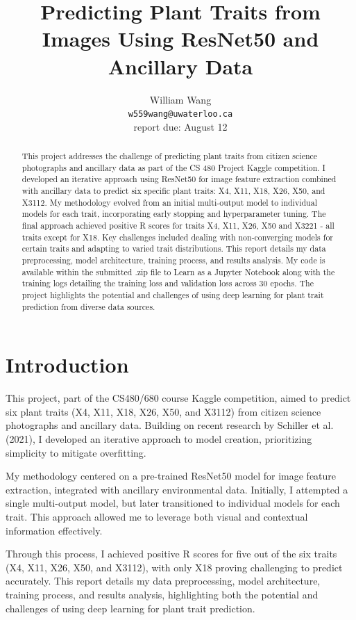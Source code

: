 \documentclass{article}
\title{Predicting Plant Traits from Images Using ResNet50 and Ancillary Data}
\author{
	William Wang \\
	\texttt{w559wang@uwaterloo.ca} \\
	{\color{red} report due: August 12}
}
\begin{document}
\maketitle

\begin{abstract} 
This project addresses the challenge of predicting plant traits from citizen science photographs and ancillary data as part of the CS 480 Project Kaggle competition. I developed an iterative approach using ResNet50 for image feature extraction combined with ancillary data to predict six specific plant traits: X4, X11, X18, X26, X50, and X3112. My methodology evolved from an initial multi-output model to individual models for each trait, incorporating early stopping and hyperparameter tuning. The final approach achieved positive R scores for traits X4, X11, X26, X50 and X3221 - all traits except for X18. Key challenges included dealing with non-converging models for certain traits and adapting to varied trait distributions. This report details my data preprocessing, model architecture, training process, and results analysis. My code is available within the submitted .zip file to Learn as a Jupyter Notebook along with the training logs detailing the training loss and validation loss across 30 epochs. The project highlights the potential and challenges of using deep learning for plant trait prediction from diverse data sources.
\end{abstract} 

\section{Introduction}
This project, part of the CS480/680 course Kaggle competition, aimed to predict six plant traits (X4, X11, X18, X26, X50, and X3112) from citizen science photographs and ancillary data. Building on recent research by Schiller et al. (2021), I developed an iterative approach to model creation, prioritizing simplicity to mitigate overfitting.

My methodology centered on a pre-trained ResNet50 model for image feature extraction, integrated with ancillary environmental data. Initially, I attempted a single multi-output model, but later transitioned to individual models for each trait. This approach allowed me to leverage both visual and contextual information effectively.

Through this process, I achieved positive R scores for five out of the six traits (X4, X11, X26, X50, and X3112), with only X18 proving challenging to predict accurately. This report details my data preprocessing, model architecture, training process, and results analysis, highlighting both the potential and challenges of using deep learning for plant trait prediction.
\end{document}
